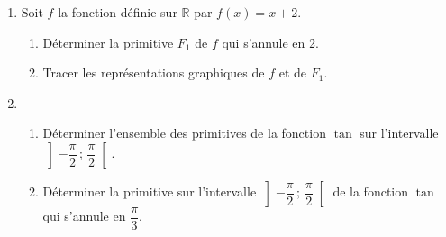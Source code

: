 
\begin{exercice}\label{exostarterST-0017}

  \begin{enumerate}
  \item Soit $f$ la fonction définie sur $\mathbb{R}$ par $f(x)=x+2$.
    \begin{enumerate}
    \item Déterminer la primitive $F_{1}$ de $f$ qui s'annule en 2.
    \item Tracer les représentations graphiques de $f$ et de $F_{1}$.
    \end{enumerate}

    \item\begin{enumerate}
    \item Déterminer l'ensemble des primitives de la fonction $\tan$ sur l'intervalle $\left]-\dfrac{\pi}{2}\,;\,\dfrac{\pi}{2}\right[$.
      \item Déterminer la primitive  sur l'intervalle $\left]-\dfrac{\pi}{2}\,;\,\dfrac{\pi}{2}\right[$ de la fonction $\tan$ qui s'annule en $\dfrac{\pi}{3}$.
    \end{enumerate}
  \end{enumerate}



\end{exercice}
